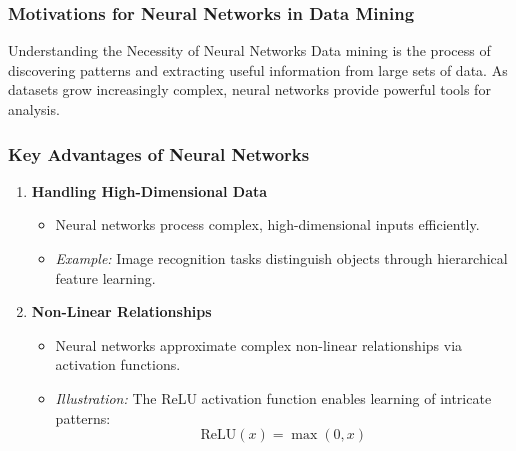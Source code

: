 \documentclass[aspectratio=169]{beamer}
\begin{document}
\begin{frame}[fragile]
    \frametitle{Motivations for Neural Networks in Data Mining}
    \begin{block}{Understanding the Necessity of Neural Networks}
        Data mining is the process of discovering patterns and extracting useful information from large sets of data. As datasets grow increasingly complex, neural networks provide powerful tools for analysis.
    \end{block}
\end{frame}

\begin{frame}[fragile]
    \frametitle{Key Advantages of Neural Networks}
    \begin{enumerate}
        \item \textbf{Handling High-Dimensional Data}
            \begin{itemize}
                \item Neural networks process complex, high-dimensional inputs efficiently.
                \item \textit{Example:} Image recognition tasks distinguish objects through hierarchical feature learning.
            \end{itemize}
        
        \item \textbf{Non-Linear Relationships}
            \begin{itemize}
                \item Neural networks approximate complex non-linear relationships via activation functions.
                \item \textit{Illustration:} The ReLU activation function enables learning of intricate patterns:
                \begin{equation}
                    \text{ReLU}(x) = \max(0, x)
                \end{equation}
            \end{itemize}
    \end{enumerate}
\end{frame}
\end{document}
